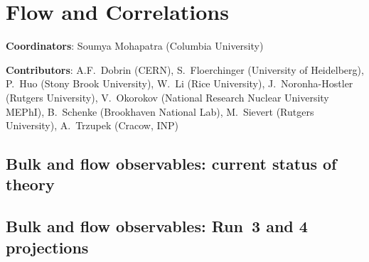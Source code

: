 \documentclass[../report.tex]{subfiles}
\providecommand{\main}{..}
\begin{document}
\section{Flow and Correlations}
\label{sec:flow}

{ \small
\noindent \textbf{Coordinators}: Soumya Mohapatra (Columbia University)

\noindent \textbf{Contributors}: 
A.F.~Dobrin (CERN), 
S.~Floerchinger (University of Heidelberg), 
P.~Huo (Stony Brook University), 
W.~Li (Rice University), 
J.~Noronha-Hostler (Rutgers University), 
V.~Okorokov (National Research Nuclear University MEPhI), 
B.~Schenke (Brookhaven National Lab), 
M.~Sievert (Rutgers University), 
A.~Trzupek (Cracow, INP)
}

\subsection{Bulk and flow observables: current status of theory}
\FloatBarrier
\subsection{Bulk and flow observables: Run~3 and 4 projections}
\FloatBarrier
\FloatBarrier
\FloatBarrier
\FloatBarrier
\FloatBarrier
\end{document}
